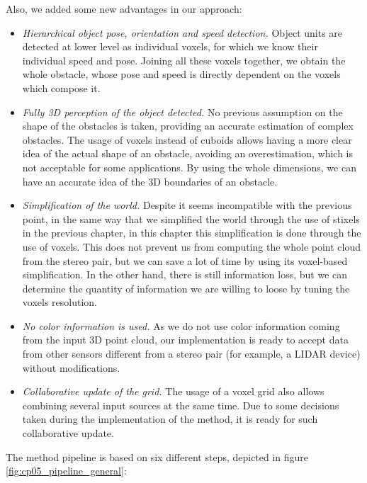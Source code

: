Also, we added some new advantages in our approach:
\begin{itemize}
 \item \emph{Hierarchical object pose, orientation and speed detection.} Object units are detected at lower level as individual voxels, for which we know their individual speed and pose. Joining all these voxels together, we obtain the whole obstacle, whose pose and speed is directly dependent on the voxels which compose it. 
 \item \emph{Fully 3D perception of the object detected.} No previous assumption on the shape of the obstacles is taken, providing an accurate estimation of complex obstacles. The usage of voxels instead of cuboids allows having a more clear idea of the actual shape of an obstacle, avoiding an overestimation, which is not acceptable for some applications. By using the whole dimensions, we can have an accurate idea of the 3D boundaries of an obstacle.
 \item \emph{Simplification of the world.} Despite it seems incompatible with the previous point, in the same way that we simplified the world through the use of stixels in the previous chapter, in this chapter this simplification is done through the use of voxels. This does not prevent us from computing the whole point cloud from the stereo pair, but we can save a lot of time by using its voxel-based simplification. In the other hand, there is still information loss, but we can determine the quantity of information we are willing to loose by tuning the voxels resolution.
 \item \emph{No color information is used.} As we do not use color information coming from the input 3D point cloud, our implementation is ready to accept data from other sensors different from a stereo pair (for example, a \ac{LIDAR} device) without modifications.
 \item \emph{Collaborative update of the grid.} The usage of a voxel grid also allows combining several input sources at the same time. Due to some decisions taken during the implementation of the method, it is ready for such collaborative update.
\end{itemize}

The method pipeline is based on six different steps, depicted in figure \ref{fig:cp05_pipeline_general}:


